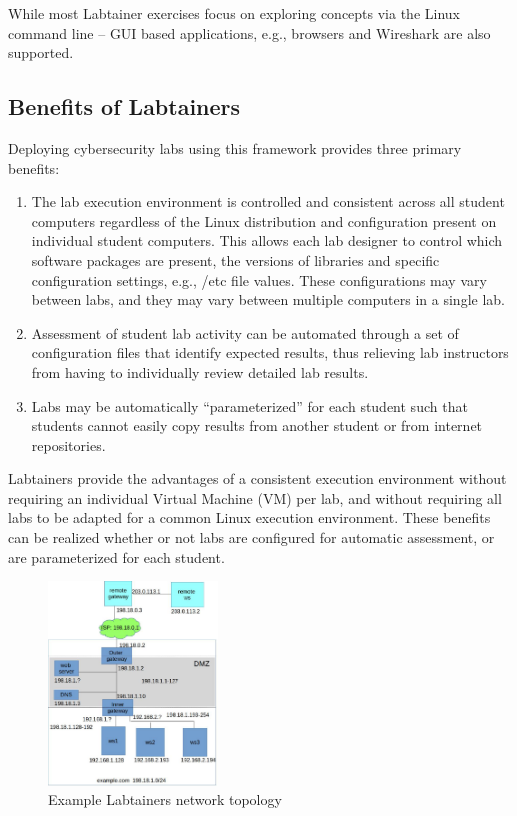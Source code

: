 \documentclass[12pt]{article}
\begin{document}
While most Labtainer exercises focus on exploring concepts via the Linux command line -- GUI based
applications, e.g., browsers and Wireshark are also supported. 

\subsection {Benefits of Labtainers}

Deploying cybersecurity labs using this framework
provides three primary benefits:

\begin{enumerate}
\item The lab execution environment is controlled and consistent
across all student computers regardless of the Linux distribution
and configuration present on individual student computers.  
This allows each lab designer to control
which software packages are present, the versions of libraries and
specific configuration settings, e.g., /etc file values. These configurations
may vary between labs, and they may vary between multiple computers in
a single lab.

\item Assessment of student lab activity can be automated through a
set of configuration files that identify expected results, thus
relieving lab instructors from having to individually review detailed lab
results.

\item Labs may be automatically ``parameterized'' for each student such that
students cannot easily copy results from another student or from internet
repositories.  
\end{enumerate}

Labtainers provide the advantages of a consistent
execution environment without requiring
an individual Virtual Machine (VM) per lab, and without requiring all labs to be adapted for
a common Linux execution environment.   These benefits can be realized 
whether or not labs are configured for automatic assessment, 
or are parameterized for each student.

\begin{figure}[H]
\centering
\includegraphics[width=0.4\textwidth]{dmz-lab.jpg}
\caption{Example Labtainers network topology}
\label{fig:dmz}
\end{figure}
\end{document}
